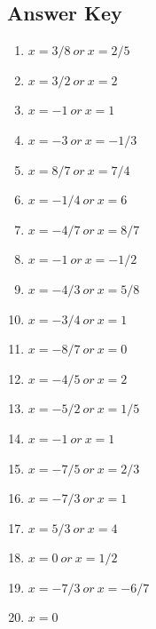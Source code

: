 \documentclass{article}
\begin{document}
\newpage

\subsection*{Answer Key}

\begin{enumerate}
\item $\displaystyle x =3/8\ or \ x =2/5 $ \ 
\item $\displaystyle x =3/2\ or \ x =2 $ \ 
\item $\displaystyle x =-1\ or \ x =1 $ \ 
\item $\displaystyle x =-3\ or \ x =-1/3 $ \ 
\item $\displaystyle x =8/7\ or \ x =7/4 $ \ 
\item $\displaystyle x =-1/4\ or \ x =6 $ \ 
\item $\displaystyle x =-4/7\ or \ x =8/7 $ \ 
\item $\displaystyle x =-1\ or \ x =-1/2 $ \ 
\item $\displaystyle x =-4/3\ or \ x =5/8 $ \ 
\item $\displaystyle x =-3/4\ or \ x =1 $ \ 
\item $\displaystyle x =-8/7\ or \ x =0 $ \ 
\item $\displaystyle x =-4/5\ or \ x =2 $ \ 
\item $\displaystyle x =-5/2\ or \ x =1/5 $ \ 
\item $\displaystyle x =-1\ or \ x =1 $ \ 
\item $\displaystyle x =-7/5\ or \ x =2/3 $ \ 
\item $\displaystyle x =-7/3\ or \ x =1 $ \ 
\item $\displaystyle x =5/3\ or \ x =4 $ \ 
\item $\displaystyle x =0\ or \ x =1/2 $ \ 
\item $\displaystyle x =-7/3\ or \ x =-6/7 $ \ 
\item $\displaystyle x =0 $ \ 

\end{enumerate}
\end{document}
